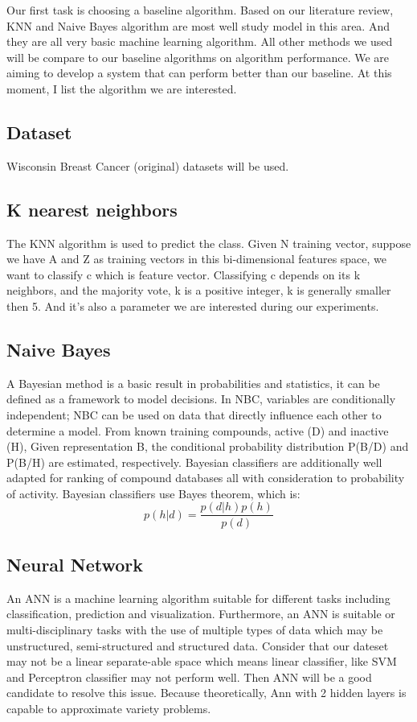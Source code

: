 \documentclass{article} %
\begin{document}
Our first task is choosing a baseline algorithm. Based on our literature review, KNN and Naive Bayes algorithm are most well study model in this area. And they are all very basic machine learning algorithm. All other methods we used will be compare to our baseline algorithms on algorithm performance. We are aiming to develop a system that can perform better than our baseline. At this moment, I list the algorithm we are interested. 

\subsection{Dataset}
Wisconsin Breast Cancer (original) datasets will be used. 

\subsection{K nearest neighbors}
The KNN algorithm is used to predict the class. Given N training vector, suppose we
have A and Z as training vectors in this bi-dimensional features space, we want to classify c which is feature vector. Classifying c depends on its k neighbors, and the majority vote, k is a positive integer, k is generally smaller then 5. And it's also a parameter we are interested during our experiments.

\subsection{Naive Bayes}
A Bayesian method is a basic result in probabilities and statistics, it can be defined as a framework to model decisions. In NBC, variables are conditionally independent; NBC can be used on data that directly influence each other to determine a model. From known training compounds, active (D) and inactive (H), Given representation B, the conditional probability distribution P(B/D) and P(B/H) are estimated, respectively. Bayesian classifiers are additionally well adapted for ranking of compound databases all with consideration to probability of activity.
Bayesian classifiers use Bayes theorem, which is:
\begin{equation}
p(h|d) = \frac{p(d|h)p(h)}{p(d)}
\end{equation}

\subsection{Neural Network}
An ANN is a machine learning algorithm suitable for different tasks including classification, prediction and visualization. Furthermore, an ANN is suitable or multi-disciplinary tasks with the use of multiple types of data which may be unstructured, semi-structured and structured data. Consider that our dateset may not be a linear separate-able space which means linear classifier, like SVM and Perceptron classifier may not perform well. Then ANN will be a good candidate to resolve this issue. Because theoretically, Ann with 2 hidden layers is capable to approximate variety problems. 
\end{document}
